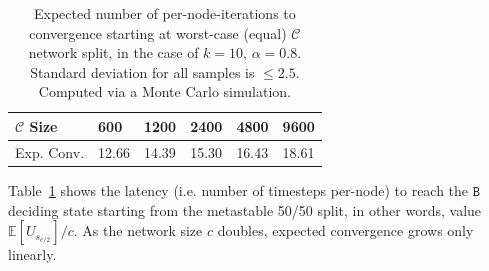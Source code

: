 \documentclass[letterpaper,twocolumn,10pt]{article}
\newcommand{\tronly}[2]{#1}
\newtheorem{lemma}[theorem]{Lemma}
\theoremstyle{definition}
\newcommand{\Jon}[1]{{\color{blue} \textbf{Jon: } #1}}
\begin{document}
\begin{appendices}

\begin{table}[h!]
	\centering
	\begin{tabular}{llllll}
		$\mathcal{C}$ Size   & 600    & 1200   & 2400   & 4800   & 9600    \\ \hline
		Exp. Conv. & 12.66 & 14.39 & 15.30 & 16.43 & 18.61
	\end{tabular}
    \caption{Expected number of per-node-iterations to convergence starting at worst-case (equal) $\mathcal{C}$ network split, in the case of $k = 10$, $\alpha=0.8$. Standard deviation for all samples is $\leq 2.5$. Computed via a Monte Carlo simulation.}
	\label{table:growth_worst_case}
\end{table}
Table~\ref{table:growth_worst_case} shows the latency (i.e. number of timesteps per-node) to reach the $\mathtt{B}$ deciding state starting from the metastable 50/50 split\tronly{, in other words, value $\mathbb{E}[\mathit{U}_{s_{c/2}}]/c$}{}. 
As the network size $c$ doubles, expected convergence grows only linearly.


\end{appendices}
\end{document}
